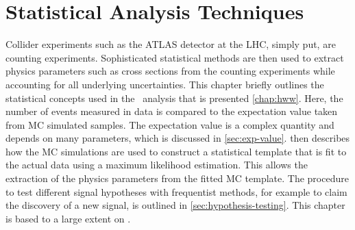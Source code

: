 \chapter{Statistical Analysis Techniques}
\label{chap:statistics}
Collider experiments such as the ATLAS detector at the LHC, simply put, are counting experiments. 
Sophisticated statistical methods are then used to extract physics parameters such as cross sections from the counting experiments while accounting for all underlying uncertainties. 
This chapter briefly outlines the statistical concepts used in the \HWWhalfdet\ analysis that is presented \cref{chap:hww}.
Here, the number of events measured in data is compared to the expectation value taken from MC simulated samples. The expectation value is a complex quantity and depends on many parameters, which is discussed in \cref{sec:exp-value}.
 then describes how the MC simulations are used to construct a statistical template that is fit to the actual data using a maximum likelihood estimation. This allows the extraction of the physics parameters from the fitted MC template.
The procedure to test different signal hypotheses with frequentist methods, for example to claim the discovery of a new signal, is outlined in \cref{sec:hypothesis-testing}.
This chapter is based to a large extent on .

